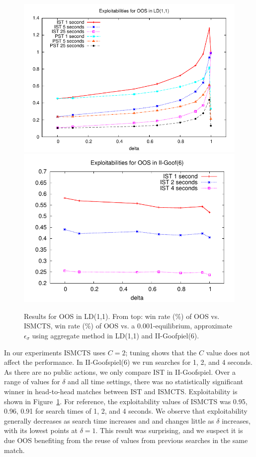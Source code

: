 \documentclass[letterpaper]{article}
\begin{document}
\begin{figure}[t!]
\begin{center}
\includegraphics[scale=0.5]{plots/oos-expl} \\
\includegraphics[scale=0.5]{plots/goof-expl} \\
\caption{Results for OOS in LD(1,1). From top: win rate (\%) of OOS vs. ISMCTS, win rate (\%) of 
OOS vs. a 0.001-equilibrium, approximate $\epsilon_{\sigma}$ using aggregate method in LD(1,1) 
and II-Goofpiel(6).  }
\label{fig:results}
\end{center}
\end{figure}

In our experiments ISMCTS uses $C = 2$; tuning shows that the $C$ value does not 
affect the performance. 
In II-Goofspiel(6) we run searches for 1, 2, and 4 seconds.
As there are no public actions, we only compare IST in II-Goofspiel. 
Over a range of values for $\delta$ and all time settings, there was no statistically significant
winner in head-to-head matches between IST and ISMCTS. 
Exploitability is shown in Figure~\ref{fig:results}. 
For reference, the exploitability values of ISMCTS was 0.95, 0.96, 0.91 for search times of 
1, 2, and 4 seconds. We observe that exploitability generally 
decreases as search time increases and and changes little as $\delta$ increases, with its 
lowest points at $\delta = 1$. 
This result was surprising, and we suspect it is due OOS benefiting from the reuse of 
values from previous searches in the same match. 
\end{document}
